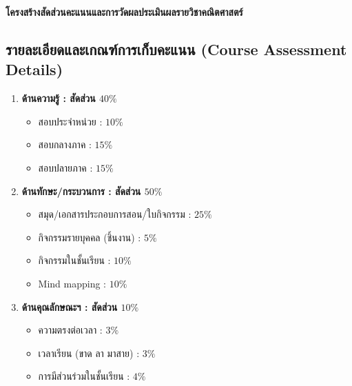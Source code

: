 
\clearpage
\thispagestyle{empty} 

\begin{center}
	\begin{tcolorbox}[
		colback=cambridgeblue!15,
		colframe=cambridgeblue!50!black,
		boxrule=0.8pt,
		arc=2mm,
		width=\linewidth
		]
		\centering
		{\Large\bfseries โครงสร้างสัดส่วนคะแนนและการวัดผลประเมินผลรายวิชาคณิตศาสตร์}
	\end{tcolorbox}
\end{center}

\subsection*{รายละเอียดและเกณฑ์การเก็บคะแนน (Course Assessment Details)}

\vspace{0.2cm}

\begin{enumerate}[label=\arabic*)., leftmargin=2em, itemsep=0.8em]
	\item \textbf{ด้านความรู้ : สัดส่วน $40\%$}
	\begin{itemize}
		\item สอบประจำหน่วย : $10\%$
		\item สอบกลางภาค : $15\%$
		\item สอบปลายภาค : $15\%$
	\end{itemize}
	
	\vspace{0.1cm}
	\item \textbf{ด้านทักษะ/กระบวนการ : สัดส่วน $50\%$}
	\begin{itemize}
		\item สมุด/เอกสารประกอบการสอน/ใบกิจกรรม : $25\%$
		\item กิจกรรมรายบุคคล (ชิ้นงาน) : $5\%$
		\item กิจกรรมในชั้นเรียน : $10\%$
		\item Mind mapping : $10\%$
	\end{itemize}
	
	\vspace{0.1cm}
	\item \textbf{ด้านคุณลักษณะฯ : สัดส่วน $10\%$}
	\begin{itemize}
		\item ความตรงต่อเวลา : $3\%$
		\item เวลาเรียน (ขาด ลา มาสาย) : $3\%$
		\item การมีส่วนร่วมในชั้นเรียน : $4\%$
	\end{itemize}
\end{enumerate}

